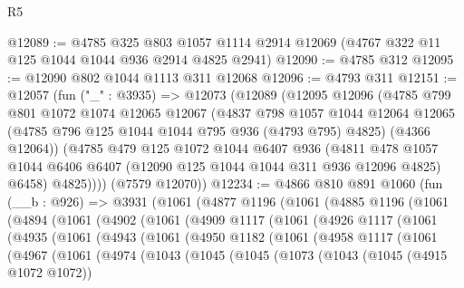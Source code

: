 \begin{lexlean}{R5}
\begin{coremodule}
@12089 := @4785
    @325
    @803
    @1057
    @1114
    @2914
    @12069
    (@4767 @322 @11 @125 @1044 @1044 @936 @2914 @4825 @2941)
@12090 := @4785 @312
@12095 := @12090 @802 @1044 @1113 @311 @12068
@12096 := @4793 @311
@12151 := @12057
    (fun ("_" : @3935) =>
    @12073
      (@12089
        (@12095
          @12096
          (@4785
            @799
            @801
            @1072
            @1074
            @12065
            @12067
            (@4837
              @798
              @1057
              @1044
              @12064
              @12065
              (@4785 @796 @125 @1044 @1044 @795 @936 (@4793 @795) @4825)
              (@4366 @12064))
            (@4785
              @479
              @125
              @1072
              @1044
              @6407
              @936
              (@4811
                @478
                @1057
                @1044
                @6406
                @6407
                (@12090 @125 @1044 @1044 @311 @936 @12096 @4825)
                @6458)
              @4825))))
      (@7579 @12070))
@12234 := @4866
    @810
    @891
    @1060
    (fun (__b : @926) =>
    @3931
      (@1061
        (@4877
          @1196
          (@1061
            (@4885
              @1196
              (@1061
                (@4894
                  (@1061
                    (@4902
                      (@1061
                        (@4909
                          @1117
                          (@1061
                            (@4926
                              @1117
                              (@1061
                                (@4935
                                  (@1061
                                    (@4943
                                      (@1061
                                        (@4950
                                          @1182
                                          (@1061
                                            (@4958
                                              @1117
                                              (@1061
                                                (@4967
                                                  (@1061
                                                    (@4974
                                                      (@1043
                                                        (@1045
                                                          (@1045
                                                            (@1073
                                                              (@1043
                                                                (@1045 (@4915 @1072 @1072))

\end{coremodule}
\end{lexlean}
